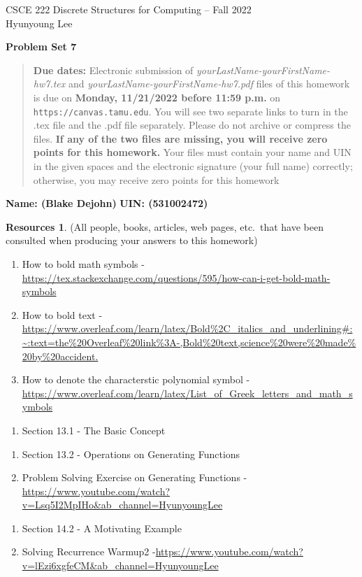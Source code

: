 \documentclass{article}
\theoremstyle{definition}
\newtheorem*{resources}{Resources}
\newcommand{\name}[2]{\noindent\textbf{Name: #1}\hfill \textbf{UIN: #2}
  \newcommand{\myName}{#1}
  \newcommand{\myUIN}{#2}
}
\newcommand{\problemset}[1]{\begin{center}\textbf{Problem Set #1}\end{center}}
\newcommand{\duedate}[1]{\begin{quote}\textbf{Due dates:} Electronic
    submission of \textsl{yourLastName-yourFirstName-hw7.tex} and 
    \textsl{yourLastName-yourFirstName-hw7.pdf} files of this homework is due on
    \textbf{#1} on \texttt{https://canvas.tamu.edu}. You will see two separate links
    to turn in the .tex file and the .pdf file separately. Please do not archive or compress the files.  
    \textbf{If any of the two files are missing, you will receive zero points for this homework.}
    Your files must contain your name and UIN in the given spaces and the electronic signature
    (your full name) correctly; otherwise, you may receive zero points for this homework\end{quote} }
\begin{document}
\begin{center}
{\large
CSCE 222 Discrete Structures for Computing -- Fall 2022\\[.5ex]
Hyunyoung Lee\\}
\end{center}
\problemset{7}
\duedate{Monday, 11/21/2022 before 11:59 p.m.}
\name{ (Blake Dejohn) }{ (531002472) } %
\begin{resources} (All people, books, articles, web pages, etc.\ that
  have been consulted when producing your answers to this homework)
\begin{enumerate}
\subsection*{Resources Overall (used for the whole document)}
\item How to bold math symbols - \url{https://tex.stackexchange.com/questions/595/how-can-i-get-bold-math-symbols}
\item How to bold text - \url{https://www.overleaf.com/learn/latex/Bold%2C_italics_and_underlining#:~:text=the%20Overleaf%20link%3A-,Bold%20text,science%20were%20made%20by%20accident.}
\item How to denote the characterstic polynomial symbol - \url{https://www.overleaf.com/learn/latex/List_of_Greek_letters_and_math_symbols}
\end{enumerate}
\begin{enumerate}
\subsection*{Problem 1}
\item Section 13.1 - The Basic Concept
\end{enumerate}
\begin{enumerate}
\subsection*{Problem 2}
\item Section 13.2 - Operations on Generating Functions
\item Problem Solving Exercise on Generating Functions - \url{https://www.youtube.com/watch?v=Lsq5I2MpIHo&ab_channel=HyunyoungLee}
\end{enumerate}
\begin{enumerate}
\subsection*{Problem 3}
\item Section 14.2 - A Motivating Example
\item Solving Recurrence Warmup2 -\url{https://www.youtube.com/watch?v=lEzi6xgfeCM&ab_channel=HyunyoungLee}
\end{enumerate}
\begin{enumerate}

\end{enumerate}
\end{resources}
\end{document}

